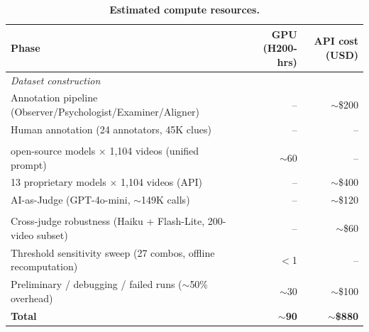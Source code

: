 \documentclass{llmxive}
\providecommand{\arraystretch}{1.15}
\begin{document}
\begin{table}[t]
\centering
\small
\setlength{\tabcolsep}{6pt}
\renewcommand{\arraystretch}{1.15}
\begin{tabular}{lrr}
\toprule
\textbf{Phase} & \textbf{GPU (H200-hrs)} & \textbf{API cost (USD)} \\
\midrule
\multicolumn{3}{l}{\textit{Dataset construction}} \\
\addlinespace[2pt]
Annotation pipeline (Observer/Psychologist/Examiner/Aligner) & -- & $\sim$\$200 \\
Human annotation (24 annotators, 45K clues) & -- & -- \\
\addlinespace[4pt]
\multicolumn{3}{l}{\textit{Main benchmark evaluation}} \\
\addlinespace[2pt]
14 open-source models $\times$ 1,104 videos (unified prompt) & $\sim$60 & -- \\
13 proprietary models $\times$ 1,104 videos (API) & -- & $\sim$\$400 \\
AI-as-Judge (GPT-4o-mini, $\sim$149K calls) & -- & $\sim$\$120 \\
\addlinespace[4pt]
\multicolumn{3}{l}{\textit{Robustness and auxiliary experiments}} \\
\addlinespace[2pt]
Cross-judge robustness (Haiku + Flash-Lite, 200-video subset) & -- & $\sim$\$60 \\
Threshold sensitivity sweep (27 combos, offline recomputation) & $<$1 & -- \\
Preliminary / debugging / failed runs ($\sim$50\% overhead) & $\sim$30 & $\sim$\$100 \\
\midrule
\textbf{Total} & $\sim$\textbf{90} & $\sim$\textbf{\$880} \\
\bottomrule
\end{tabular}
\caption{\textbf{Estimated compute resources.}}
\label{tab:compute}
\end{table}
\end{document}
